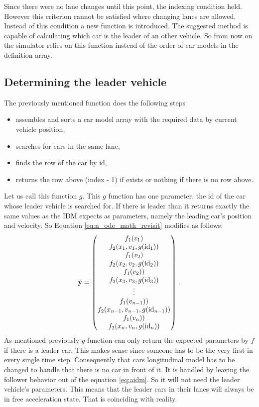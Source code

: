 		Since there were no lane changes until this point, the indexing condition held. However this criterion cannot be satisfied where changing lanes are allowed. Instead of this condition a new function is introduced. The suggested method is capable of calculating which car is the leader of an other vehicle. So from now on the simulator relies on this function instead of the order of car models in the definition array.
		\subsection*{Determining the leader vehicle}
		The previously mentioned function does the following steps
		\begin{itemize}
			\item assembles and sorts a car model array with the required data by current vehicle position,
			\item searches for cars in the same lane,
			\item finds the row of the car by id,
			\item returns the row above (index - 1) if exists or nothing if there is no row above.
		\end{itemize}
		Let us call this function $g$. This $g$ function has one parameter, the id of the car whose leader vehicle is searched for. If there is leader than it returns exactly the same values as the IDM expects as parameters, namely the leading car's position and velocity.
		So Equation \ref{eq:n_ode_math_revisit} modifies as follows:
		\begin{equation}
			\dot{\textbf{y}}=
			\begin{pmatrix}
			f_1(v_1)\\
			f_2(x_{1}, v_{1},g({\rm id}_1))\\
			f_1(v_2)\\
			f_2(x_{2}, v_{2},g({\rm id}_2))\\
			f_1(v_2))\\
			f_2(x_{3}, v_{3},g({\rm id}_3))\\
			\vdots\\
			f_1(v_{n-1}))\\
			f_2(x_{n-1}, v_{n-1},g({\rm id}_{n-1}))\\
			f_1(v_n))\\
			f_2(x_{n}, v_{n},g({\rm id}_{n}))
			\end{pmatrix}\,.
			\label{eq:n_ode_math_with_find_leading}
		\end{equation}
		As mentioned previously $g$ function can only return the expected parameters by $f$ if there is a leader car. This makes sense since someone has to be the very first in every single time step. Consequently that cars longitudinal model has to be changed to handle that there is no car in front of it. It is handled by leaving the follower behavior out of the equation \ref{eq:aidm}. So it will not need the leader vehicle's parameters. This means that the leader cars in their lanes will always be in free acceleration state. That is coinciding with reality. 
